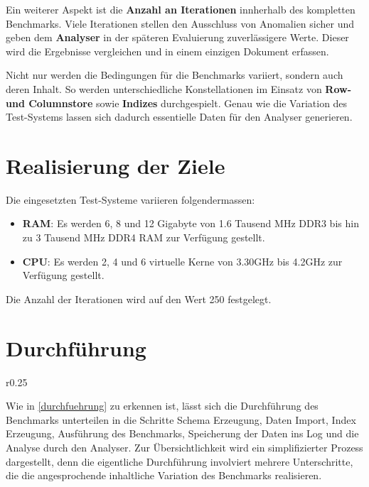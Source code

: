 Ein weiterer Aspekt ist die \textbf{Anzahl an Iterationen} innherhalb des kompletten Benchmarks. Viele Iterationen stellen den Ausschluss von Anomalien sicher und geben dem \textbf{Analyser} in der späteren Evaluierung zuverlässigere Werte. Dieser wird die Ergebnisse vergleichen und in einem einzigen Dokument erfassen. 

Nicht nur werden die Bedingungen für die Benchmarks variiert, sondern auch deren Inhalt. So werden unterschiedliche Konstellationen im Einsatz von \textbf{Row- und Columnstore} sowie \textbf{Indizes} durchgespielt. Genau wie die Variation des Test-Systems lassen sich dadurch essentielle Daten für den Analyser generieren. 

\section{Realisierung der Ziele}

Die eingesetzten Test-Systeme variieren folgendermassen: 
\begin{itemize}
	\item \textbf{RAM}: Es werden 6, 8 und 12 Gigabyte von 1.6 Tausend MHz DDR3 bis hin zu 3 Tausend MHz DDR4 RAM zur Verfügung gestellt. 
	\item \textbf{CPU}: Es werden 2, 4 und 6 virtuelle Kerne von 3.30GHz bis 4.2GHz zur Verfügung gestellt. 
\end{itemize}

Die Anzahl der Iterationen wird auf den Wert 250 festgelegt.

\newpage

\section{Durchführung}

\begin{wrapfigure}{r}{0.25\textwidth} 
\end{wrapfigure}

Wie in \autoref{durchfuehrung} zu erkennen ist, lässt sich die Durchführung des Benchmarks unterteilen in die Schritte Schema Erzeugung, Daten Import, Index Erzeugung, Ausführung des Benchmarks, Speicherung der Daten ins Log und die Analyse durch den Analyser. Zur Übersichtlichkeit wird ein simplifizierter Prozess dargestellt, denn die eigentliche Durchführung involviert mehrere Unterschritte, die die angesprochende inhaltliche Variation des Benchmarks realisieren. 

